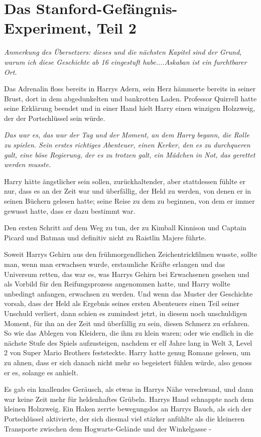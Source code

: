 \chapter{Das Stanford-Gefängnis-Experiment, Teil 2}

\emph{Anmerkung des Übersetzers: dieses und die nächsten Kapitel sind der
Grund, warum ich diese Geschichte ab 16 eingestuft habe....Askaban ist ein
furchtbarer Ort.}

Das Adrenalin floss bereits in Harrys Adern, sein Herz hämmerte bereits in
seiner Brust, dort in dem abgedunkelten und bankrotten Laden. Professor Quirrell
hatte seine Erklärung beendet und in einer Hand hielt Harry einen winzigen
Holzzweig, der der Portschlüssel sein würde.

\emph{Das war es, das war der Tag und der Moment, an dem Harry begann, die
Rolle zu spielen. Sein erstes richtiges Abenteuer, einen Kerker, den es zu
durchqueren galt, eine böse Regierung, der es zu trotzen galt, ein Mädchen in
Not, das gerettet werden musste.}

Harry hätte ängstlicher sein sollen, zurückhaltender, aber stattdessen fühlte er
nur, dass es an der Zeit war und überfällig, der Held zu werden, von denen er in
seinen Büchern gelesen hatte; seine Reise zu dem zu beginnen, von dem er immer
gewusst hatte, dass er dazu bestimmt war.

Den ersten Schritt auf dem Weg zu tun, der zu Kimball Kinnison und Captain
Picard und Batman und definitiv nicht zu Raistlin Majere führte.

Soweit Harrys Gehirn aus den frühmorgendlichen Zeichentrickfilmen wusste, sollte
man, wenn man erwachsen wurde, erstaunliche Kräfte erlangen und das Universum
retten, das war es, was Harrys Gehirn bei Erwachsenen gesehen und als Vorbild
für den Reifungsprozess angenommen hatte, und Harry wollte unbedingt anfangen,
erwachsen zu werden. Und wenn das Muster der Geschichte vorsah, dass der Held
als Ergebnis seines ersten Abenteuers einen Teil seiner Unschuld verliert, dann
schien es zumindest jetzt, in diesem noch unschuldigen Moment, für ihn an der
Zeit und überfällig zu sein, diesen Schmerz zu erfahren. So wie das Ablegen von
Kleidern, die ihm zu klein waren; oder wie endlich in die nächste Stufe des
Spiels aufzusteigen, nachdem er elf Jahre lang in Welt 3, Level 2 von Super
Mario Brothers feststeckte. Harry hatte genug Romane gelesen, um zu ahnen, dass
er sich danach nicht mehr so begeistert fühlen würde, also genoss er es, solange
es anhielt.

Es gab ein knallendes Geräusch, als etwas in Harrys Nähe verschwand, und dann
war keine Zeit mehr für heldenhaftes Grübeln. Harrys Hand schnappte nach dem
kleinen Holzzweig. Ein Haken zerrte bewegungslos an Harrys Bauch, als sich der
Portschlüssel aktivierte, der sich diesmal viel stärker anfühlte als die
kleineren Transporte zwischen dem Hogwarts-Gelände und der Winkelgasse -

